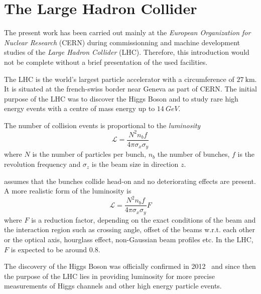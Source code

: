 \section{The Large Hadron Collider}

The present work has been carried out mainly at
the \emph{European Organization for Nuclear Research} (CERN) during commissionning and
machine development studies of
the \emph{Large Hadron Collider} (LHC).
Therefore, this introduction would not be complete without a brief presentation of the used facilities.

The LHC
 is the world's largest particle accelerator with a circumference
of $\SI{27}{\kilo\meter}$. It is situated at the french-swiss border near Geneva as part of
CERN.
The initial purpose of the LHC was to discover the Higgs Boson and to study rare high energy events 
with a centre of mass energy up to $\SI{14}{GeV}$.

The number of collision events is proportional to the \emph{luminosity}
%
\begin{equation}
    \mathscr{L} = \frac{N^2 n_b f}{4\pi\sigma_x\sigma_y}
    \label{eq_lumi}
\end{equation}
%
where $N$ is the number of particles per bunch, $n_b$ the number of bunches, $f$ is
the revolution frequency and $\sigma_z$ is the beam size in direction $z$.

 assumes that the bunches collide head-on and no deteriorating effects are present. A more realistic form of the luminosity is~\cite{Herr2003}
%
\begin{equation}
    \mathscr{L} = \frac{N^2 n_b f}{4\pi\sigma_x\sigma_y} F
\end{equation}
%
where $F$ is a reduction factor, depending on the exact conditions of the beam and the interaction region such as crossing angle, offset of the beams w.r.t. each other or the optical axis, hourglass effect, non-Gaussian beam profiles etc. In the LHC, $F$ is expected to be around $0.8$. 

The discovery of the Higgs Boson was officially confirmed in 2012~\cite{higgs_1, higgs_2} and since then the
purpose of the LHC lies in providing luminosity for more precise measurements of Higgs channels and
other high energy particle events. 


